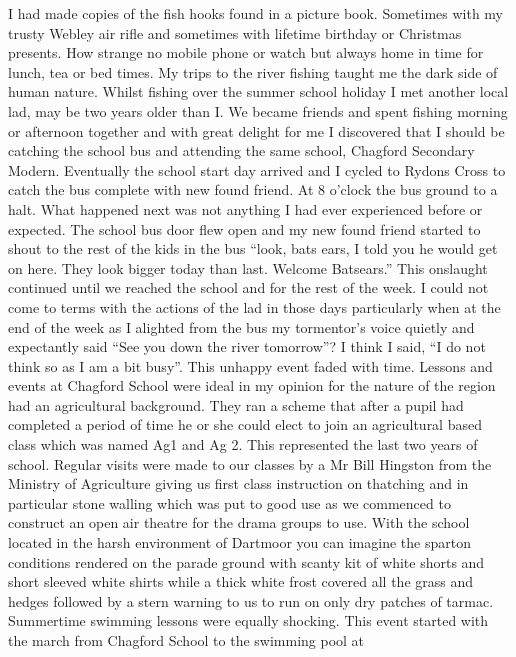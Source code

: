
I had made copies of the fish hooks found in a picture book.  Sometimes with my
trusty Webley air rifle and sometimes with lifetime birthday or Christmas
presents.  How strange no mobile phone or watch but always home in time for
lunch, tea or bed times.  My trips to the river fishing taught me the dark side
of human nature.  Whilst fishing over the summer school holiday I met another
local lad, may be two years older than I.  We became friends and spent fishing
morning or afternoon together and with great delight for me I discovered that I
should be catching the school bus and attending the same school, Chagford
Secondary Modern.  Eventually the school start day arrived and I cycled to
Rydons Cross to catch the bus complete with new found friend.  At 8 o'clock the
bus ground to a halt.  What happened next was not anything I had ever
experienced before or expected.  The school bus door flew open and my new found
friend started to shout to the rest of the kids in the bus ``look, bats ears, I
told you he would get on here.  They look bigger today than last.  Welcome
Batsears.''  This onslaught continued until we reached the school and for the
rest of the week.  I could not come to terms with the actions of the lad in
those days particularly when at the end of the week as I alighted from the bus
my tormentor's voice quietly and expectantly said ``See you down the river
tomorrow''?  I think I said, ``I do not think so as I am a bit busy''.  This
unhappy event faded with time. Lessons and events at Chagford School were ideal
in my opinion for the nature of the region had an agricultural background. They
ran a scheme that after a pupil had completed a period of time he or she could
elect to join an agricultural based class which was named Ag1 and Ag 2. This
represented the last two years of school. Regular visits were made to our
classes by a Mr Bill Hingston from the Ministry of Agriculture giving us first
class instruction on thatching and in particular stone walling which was put to
good use as we commenced to construct an open air theatre for the drama groups
to use.  With the school located in the harsh environment of Dartmoor you can
imagine the sparton conditions rendered on the parade ground with scanty kit of
white shorts and short sleeved white shirts while a thick white frost covered
all the grass and hedges followed by a stern warning to us to run on only dry
patches of tarmac.  Summertime swimming lessons were equally shocking.  This
event started with the march from Chagford School to the swimming pool at

